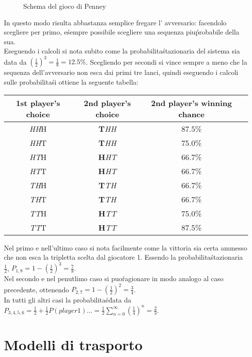 \documentclass[12pt, a4paper]{book}
\theoremstyle{theorem}
\begin{document}
\begin{figure}
\begin{tikzpicture}[x=0.75pt,y=0.75pt,yscale=-1,xscale=1]
					\end{tikzpicture}
					\caption{Schema del gioco di Penney}
					\label{Penney's scheme}
				\end{figure}
				In questo modo risulta abbastanza semplice fregare l' avversario: facendolo scegliere per primo, e\' sempre possibile scegliere una sequenza piu\' probabile della sua.\\
				Eseguendo i calcoli si nota subito come la probabilita\' stazionaria del sistema sia data da $\left(\frac{1}{2}\right)^3=\frac{1}{8}=12.5\%$.
				Scegliendo per secondi si vince sempre a meno che la sequenza dell'avversario non esca dai primi tre lanci, quindi eseguendo i calcoli sulle probabilita\' si ottiene la seguente tabella:
				\begin{center}
					\begin{tabular}{ |c|c|c|c| } 
						\hline
						1st player's choice& 2nd player's choice & 2nd player's winning chance\\
						\hline
						\emph{HH}H & \textbf{T}\emph{HH} & 87.5\% \\
						\emph{HH}T & \textbf{T}\emph{HH} & 75.0\% \\
						\emph{HT}H & \textbf{H}\emph{HT} & 66.7\% \\
						\emph{HT}T & \textbf{H}\emph{HT} & 66.7\% \\
						\emph{TH}H & \textbf{T}\emph{TH} & 66.7\% \\
						\emph{TH}T & \textbf{T}\emph{TH} & 66.7\% \\
						\emph{TT}H & \textbf{H}\emph{TT} & 75.0\% \\
						\emph{TT}T & \textbf{H}\emph{TT} & 87.5\% \\
						\hline
					\end{tabular}
				\end{center}
				Nel primo e nell'ultimo caso si nota facilmente come la vittoria sia certa ammesso che non esca la tripletta scelta dal giocatore 1.
				Essendo la probabilita\' stazionaria $\frac{1}{2}$, $P_{1,8}=1-\left(\frac{1}{2}\right)^3=\frac{7}{8}$.\\
				Nel secondo e nel penutlimo caso si puo\' ragionare in modo analogo al caso precedente, ottenendo $P_{2,7}=1-\left(\frac{1}{2}\right)^2=\frac{3}{4}$.\\
				In tutti gli altri casi la probabilita\' e\' data da $P_{3,4,5,6}=\frac{1}{2}+\frac{1}{2}P(player1)\ldots=\frac{1}{2}\sum_{n=0}^\infty\left(\frac{1}{4}\right)^n=\frac{2}{3}$.

	\chapter{Modelli di trasporto} %
\end{document}
